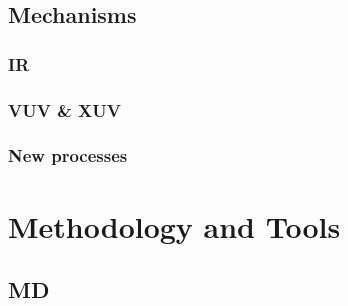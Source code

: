 \documentclass{beamer}
\begin{document}
\subsection{Mechanisms}
\begin{frame}{}
\end{frame}

\subsubsection{IR}
\begin{frame}{}
\end{frame}

\subsubsection{VUV \& XUV}
\begin{frame}{}
\end{frame}

\subsubsection{New processes}
\begin{frame}{}
\end{frame}


\section{Methodology and Tools}

\subsection{MD}
\begin{frame}{}
\end{frame}
\end{document}
